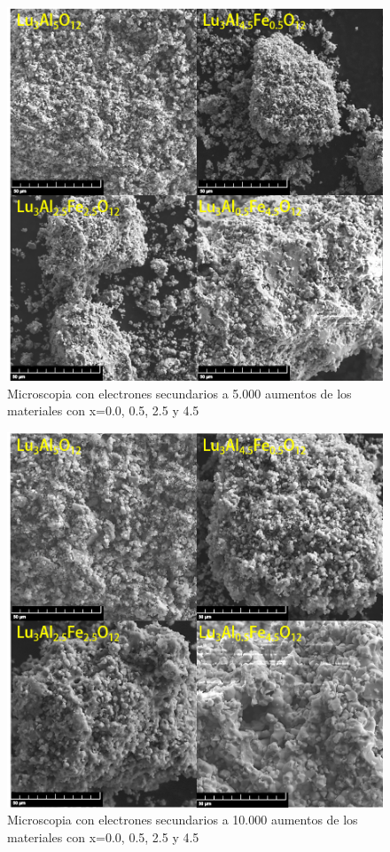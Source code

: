 \begin{appendix}
\begin{figure}[h]
		\includegraphics[width=\textwidth]{Kap5/sec5k.png}%
		\caption{Microscopia con electrones secundarios a 5.000 aumentos de los
		materiales  con x=0.0, 0.5, 2.5 y
		4.5}\label{fig:sec5}
	\end{figure}

	\begin{figure}[h]
		\centering%

		\includegraphics[width=\textwidth]{Kap5/sec10k.png}%
		\caption{Microscopia con electrones secundarios a 10.000 aumentos de los
		materiales  con x=0.0, 0.5, 2.5 y
		4.5}\label{fig:sec10}
	\end{figure}


\end{appendix}
